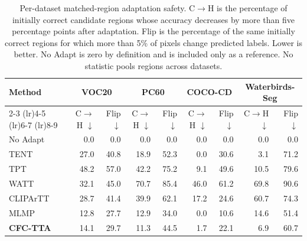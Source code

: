 \begin{table}[t]
\centering
\small
\setlength{\tabcolsep}{5pt}
\caption{Per-dataset matched-region adaptation safety. C$\rightarrow$H is the percentage of initially correct candidate regions whose accuracy decreases by more than five percentage points after adaptation. Flip is the percentage of the same initially correct regions for which more than 5\% of pixels change predicted labels. Lower is better. No Adapt is zero by definition and is included only as a reference. No statistic pools regions across datasets.}
\label{tab:baseline-ch-flip-per-dataset}
\begin{tabular}{lrrrrrrrr}
\toprule
Method & \multicolumn{2}{c}{VOC20} & \multicolumn{2}{c}{PC60} & \multicolumn{2}{c}{COCO-CD} & \multicolumn{2}{c}{Waterbirds-Seg} \\
\cmidrule(lr){2-3} \cmidrule(lr){4-5} \cmidrule(lr){6-7} \cmidrule(lr){8-9}
 & C$\rightarrow$H $\downarrow$ & Flip $\downarrow$ & C$\rightarrow$H $\downarrow$ & Flip $\downarrow$ & C$\rightarrow$H $\downarrow$ & Flip $\downarrow$ & C$\rightarrow$H $\downarrow$ & Flip $\downarrow$ \\
\midrule
No Adapt & 0.0 & 0.0 & 0.0 & 0.0 & 0.0 & 0.0 & 0.0 & 0.0 \\
TENT & 27.0 & 40.8 & 18.9 & 52.3 & 0.0 & 30.6 & 3.1 & 71.2 \\
TPT & 48.2 & 57.0 & 42.2 & 75.2 & 9.1 & 49.6 & 10.5 & 79.6 \\
WATT & 32.1 & 45.0 & 70.7 & 85.4 & 46.0 & 61.2 & 69.8 & 90.6 \\
CLIPArTT & 28.7 & 41.4 & 39.9 & 62.1 & 17.2 & 24.6 & 60.7 & 74.3 \\
MLMP & 12.8 & 27.7 & 12.9 & 34.0 & 0.0 & 10.6 & 14.6 & 51.4 \\
\textbf{CFC-TTA} & 14.1 & 29.7 & 11.3 & 44.5 & 1.7 & 22.1 & 6.9 & 60.7 \\
\bottomrule
\end{tabular}
\end{table}
